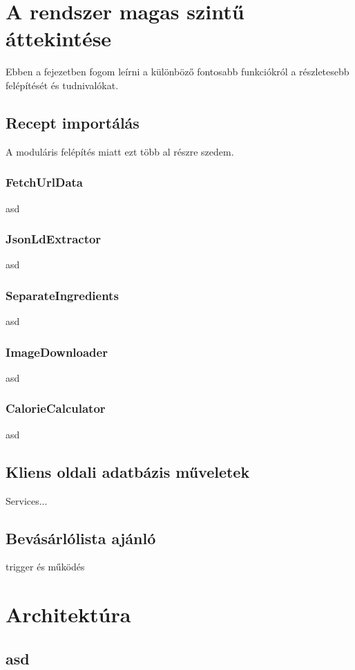 \documentclass[12pt]{report}
\theoremstyle{definition}
\begin{document}
\chapter{A rendszer magas szintű áttekintése}
Ebben a fejezetben fogom leírni a különböző fontosabb funkciókról a részletesebb felépítését és tudnivalókat.

\section{Recept importálás}
A moduláris felépítés miatt ezt több al részre szedem.

\subsection{FetchUrlData}
asd
\subsection{JsonLdExtractor}
asd
\subsection{SeparateIngredients}
asd
\subsection{ImageDownloader} 
asd
\subsection{CalorieCalculator}
asd
\section{Kliens oldali adatbázis műveletek}
Services...

\section{Bevásárlólista ajánló}
trigger és működés


\chapter{Architektúra}
\section{asd}
\end{document}
